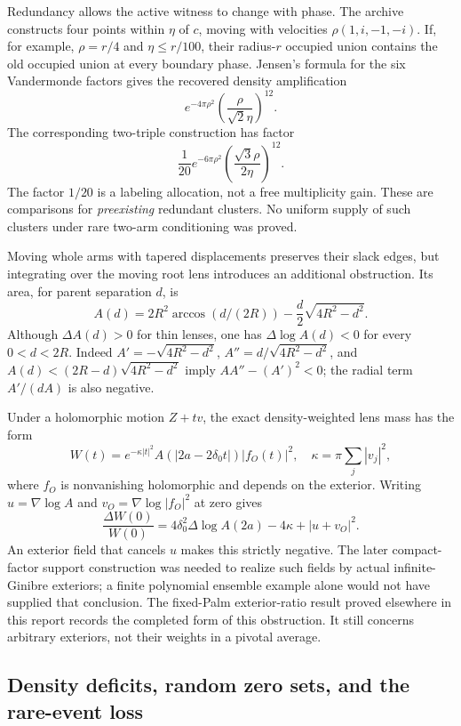 \documentclass[11pt,a4paper]{article}
\theoremstyle{definition}
\theoremstyle{remark}
\numberwithin{equation}{section}
\begin{document}
Redundancy allows the active witness to change with phase.  The archive
constructs four points within $\eta$ of $c$, moving with velocities
$\rho(1,i,-1,-i)$.  If, for example, $\rho=r/4$ and
$\eta\leq r/100$, their radius-$r$ occupied union contains the old
occupied union at every boundary phase.  Jensen's formula for the six
Vandermonde factors gives the recovered density amplification
\[
 e^{-4\pi\rho^2}
 \left(\frac{\rho}{\sqrt2\eta}\right)^{12}.
\]
The corresponding two-triple construction has factor
\[
 \frac1{20}e^{-6\pi\rho^2}
 \left(\frac{\sqrt3\rho}{2\eta}\right)^{12}.
\]
The factor $1/20$ is a labeling allocation, not a free multiplicity
gain.  These are comparisons for \emph{preexisting} redundant clusters.
No uniform supply of such clusters under rare two-arm conditioning was
proved.

Moving whole arms with tapered displacements preserves their slack
edges, but integrating over the moving root lens introduces an
additional obstruction.  Its area, for parent separation $d$, is
\[
 A(d)=2R^2\arccos(d/(2R))-\frac d2\sqrt{4R^2-d^2}.
\]
Although $\Delta A(d)>0$ for thin lenses, one has
$\Delta\log A(d)<0$ for every $0<d<2R$.  Indeed
$A'=-\sqrt{4R^2-d^2}$, $A''=d/\sqrt{4R^2-d^2}$, and
$A(d)<(2R-d)\sqrt{4R^2-d^2}$ imply $AA''-(A')^2<0$;
the radial term $A'/(dA)$ is also negative.

Under a holomorphic motion $Z+tv$, the exact density-weighted lens
mass has the form
\[
 W(t)=e^{-\kappa|t|^2}A(|2a-2\delta_0t|)|f_O(t)|^2,
 \quad\kappa=\pi\sum_j|v_j|^2,
\]
where $f_O$ is nonvanishing holomorphic and depends on the exterior.
Writing $u=\nabla\log A$ and $v_O=\nabla\log|f_O|^2$ at zero gives
\[
 \frac{\Delta W(0)}{W(0)}
 =4\delta_0^2\Delta\log A(2a)-4\kappa+|u+v_O|^2.
\]
An exterior field that cancels $u$ makes this strictly negative.
The later compact-factor support construction was needed to realize
such fields by actual infinite-Ginibre exteriors; a finite polynomial
ensemble example alone would not have supplied that conclusion.
The fixed-Palm exterior-ratio result proved elsewhere in this report
records the completed form of this obstruction.  It still concerns
arbitrary exteriors, not their weights in a pivotal average.

\subsection{Density deficits, random zero sets, and the rare-event loss}
\label{br:density}
\end{document}
